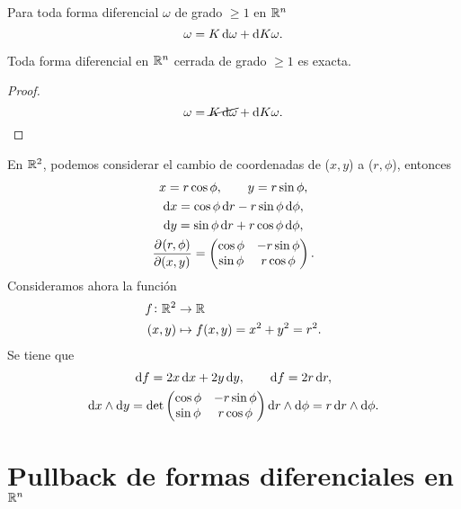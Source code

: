 \begin{lema}
    Para toda forma diferencial $\omega$ de grado $\geq 1$ en $\mathbb{R}^n$
    \[
        \omega = K \dif \omega + \dif K \omega.
    \]
\end{lema}

\begin{teolema}[de Poincar\'e]
    Toda forma diferencial en $\mathbb{R}^n$ cerrada de grado $\geq 1$ es exacta.
\end{teolema}
\begin{proof}
    \[
        \omega = \cancel{K\dif \omega} + \dif K \omega.
    \]
\end{proof}

\begin{example*}
    En $\mathbb{R}^2$, podemos considerar el cambio de coordenadas de ($x, y$) a ($r, \phi$), entonces
    \begin{gather*}
        x = r \cos \phi, \qquad y = r \sin \phi, \\
        \dif x = \cos \phi \dif r - r \sin \phi \dif \phi, \\
        \dif y = \sin \phi \dif r + r \cos \phi \dif \phi, \\
        \pdv{(r, \phi)}{(x,y)} =
        \begin{pmatrix}
            \cos \phi & - r \sin \phi \\ \sin \phi & r \cos \phi
        \end{pmatrix}.
    \end{gather*}
    Consideramos ahora la función
    \[
        \begin{aligned}
            f \colon \mathbb{R}^2 &\to \mathbb{R} \\
            (x,y) &\mapsto f(x,y) = x^2 + y^2 = r^2.
        \end{aligned}
    \]
    Se tiene que
    \begin{gather*}
        \dif f = 2x \dif x + 2y \dif y, \qquad \dif f = 2 r \dif r, \\
        \dif x \wedge \dif y = \det
        \begin{pmatrix}
            \cos \phi & - r \sin \phi \\
            \sin \phi &   r \cos \phi
        \end{pmatrix} \dif r \wedge \dif \phi = r \dif r \wedge \dif \phi.
    \end{gather*}
\end{example*}

\section{Pullback de formas diferenciales en $\mathbb{R}^n$}

